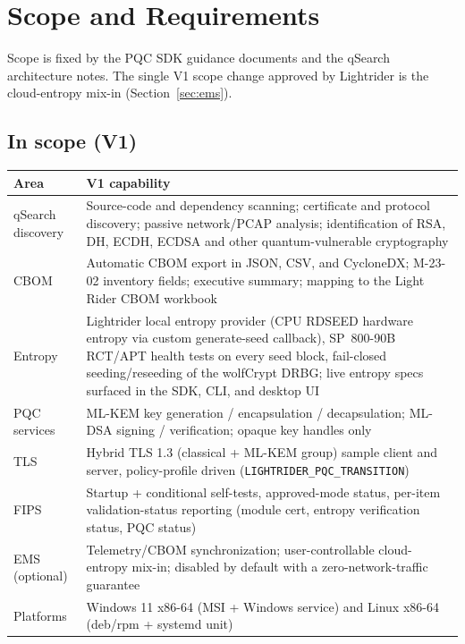 \documentclass[10pt]{article}
\newcommand{\code}[1]{\texttt{\small #1}}
\begin{document}
\section{Scope and Requirements}\label{sec:scope}

Scope is fixed by the PQC SDK guidance documents and the qSearch architecture notes.
The single V1 scope change approved by Lightrider is the cloud-entropy mix-in
(Section~\ref{sec:ems}).

\subsection{In scope (V1)}
\begin{small}
\begin{tabularx}{\textwidth}{@{}lL@{}}
\toprule
\textbf{Area} & \textbf{V1 capability} \\
\midrule
qSearch discovery & Source-code and dependency scanning; certificate and protocol
  discovery; passive network/PCAP analysis; identification of RSA, DH, ECDH, ECDSA and
  other quantum-vulnerable cryptography \\
CBOM & Automatic CBOM export in JSON, CSV, and CycloneDX; M-23-02 inventory fields;
  executive summary; mapping to the Light Rider CBOM workbook \\
Entropy & Lightrider local entropy provider (CPU RDSEED hardware entropy via custom
  generate-seed callback), SP~800-90B RCT/APT health tests on every seed block, fail-closed
  seeding/reseeding of the wolfCrypt DRBG; live entropy specs surfaced in the SDK, CLI,
  and desktop UI \\
PQC services & ML-KEM key generation / encapsulation / decapsulation; ML-DSA signing /
  verification; opaque key handles only \\
TLS & Hybrid TLS 1.3 (classical + ML-KEM group) sample client and server, policy-profile
  driven (\code{LIGHTRIDER\_PQC\_TRANSITION}) \\
FIPS & Startup + conditional self-tests, approved-mode status, per-item validation-status
  reporting (module cert, entropy verification status, PQC status) \\
EMS (optional) & Telemetry/CBOM synchronization; user-controllable cloud-entropy mix-in;
  disabled by default with a zero-network-traffic guarantee \\
Platforms & Windows 11 x86-64 (MSI + Windows service) and Linux x86-64
  (deb/rpm + systemd unit) \\
\bottomrule
\end{tabularx}
\end{small}
\end{document}
